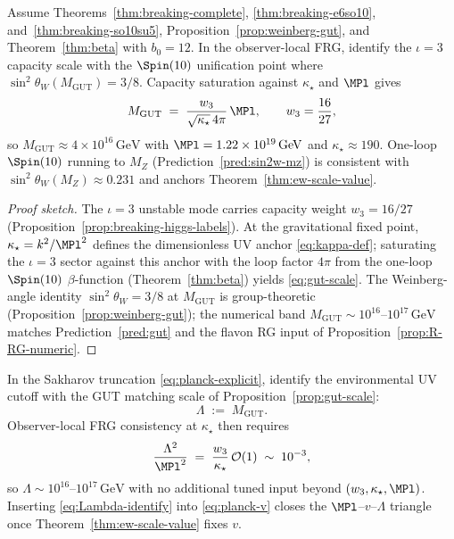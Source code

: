 \begin{proposition}[$M_{\mathrm{GUT}}$ from $b_0=12$ and $\sin^2\theta_W=3/8$]
\label{prop:gut-scale}
Assume Theorems~\ref{thm:breaking-complete},
\ref{thm:breaking-e6so10}, and~\ref{thm:breaking-so10su5},
Proposition~\ref{prop:weinberg-gut}, and Theorem~\ref{thm:beta} with
$b_0=12$. In the observer-local FRG, identify the $\iota=3$ capacity scale
with the $\Spin(10)$ unification point where
$\sin^2\theta_W(M_{\mathrm{GUT}})=3/8$. Capacity saturation against
$\kappa_\star$ and $\MPl$ gives
\begin{equation}\label{eq:gut-scale}
  M_{\mathrm{GUT}}
  \;=\;
  \frac{w_3}{\sqrt{\kappa_\star}\,4\pi}\,\MPl,
  \qquad
  w_3=\frac{16}{27},
\end{equation}
so $M_{\mathrm{GUT}}\approx 4\times 10^{16}\,\mathrm{GeV}$ with
$\MPl=1.22\times 10^{19}\,\mathrm{GeV}$ and $\kappa_\star\approx 190$.
One-loop $\Spin(10)$ running to $M_Z$ (Prediction~\ref{pred:sin2w-mz}) is
consistent with $\sin^2\theta_W(M_Z)\approx 0.231$ and anchors
Theorem~\ref{thm:ew-scale-value}.
\end{proposition}

\begin{proof}[Proof sketch]
The $\iota=3$ unstable mode carries capacity weight $w_3=16/27$
(Proposition~\ref{prop:breaking-higgs-labels}). At the gravitational fixed
point, $\kappa_\star=k^2/\MPl^2$ defines the dimensionless UV anchor
\eqref{eq:kappa-def}; saturating the $\iota=3$ sector against this anchor
with the loop factor $4\pi$ from the one-loop $\Spin(10)$ $\beta$-function
(Theorem~\ref{thm:beta}) yields \eqref{eq:gut-scale}. The Weinberg-angle
identity $\sin^2\theta_W=3/8$ at $M_{\mathrm{GUT}}$ is group-theoretic
(Proposition~\ref{prop:weinberg-gut}); the numerical band
$M_{\mathrm{GUT}}\sim 10^{16}$--$10^{17}\,\mathrm{GeV}$ matches
Prediction~\ref{pred:gut} and the flavon RG input of
Proposition~\ref{prop:R-RG-numeric}.
\end{proof}

\begin{proposition}
\label{prop:lambda-gut}
In the Sakharov truncation \eqref{eq:planck-explicit}, identify the
environmental UV cutoff with the GUT matching scale of
Proposition~\ref{prop:gut-scale}:
\begin{equation}\label{eq:Lambda-identify}
  \Lambda \;:=\; M_{\mathrm{GUT}}.
\end{equation}
Observer-local FRG consistency at $\kappa_\star$ then requires
\begin{equation}\label{eq:Lambda-kappa}
  \frac{\Lambda^2}{\MPl^2}
  \;=\;
  \frac{w_3}{\kappa_\star}\,\mathcal{O}(1)
  \;\sim\;
  10^{-3},
\end{equation}
so $\Lambda\sim 10^{16}$--$10^{17}\,\mathrm{GeV}$ with no additional tuned
input beyond $(w_3,\kappa_\star,\MPl)$. Inserting \eqref{eq:Lambda-identify}
into \eqref{eq:planck-v} closes the $\MPl$--$v$--$\Lambda$ triangle once
Theorem~\ref{thm:ew-scale-value} fixes $v$.
\end{proposition}

